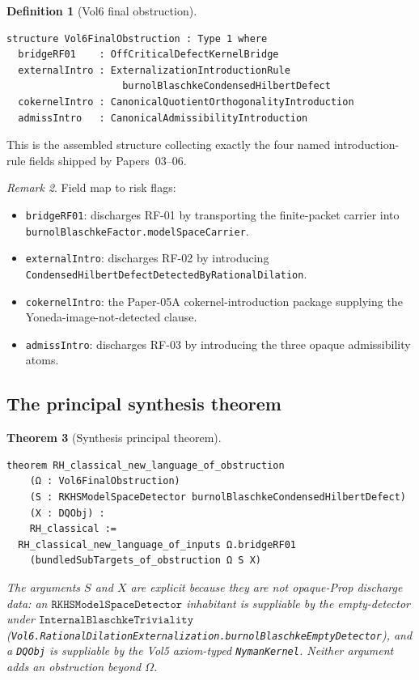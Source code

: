 \documentclass[11pt]{article}
\theoremstyle{plain}
\newtheorem{theorem}{Theorem}[section]
\theoremstyle{definition}
\newtheorem{definition}[theorem]{Definition}
\theoremstyle{remark}
\newtheorem{remark}[theorem]{Remark}
\newcommand{\code}[1]{\texttt{#1}}
\newcommand{\Obs}{\Omega}
\begin{document}
\begin{definition}[Vol6 final obstruction]
\label{def:final-obstruction}
\begin{lstlisting}
structure Vol6FinalObstruction : Type 1 where
  bridgeRF01    : OffCriticalDefectKernelBridge
  externalIntro : ExternalizationIntroductionRule
                    burnolBlaschkeCondensedHilbertDefect
  cokernelIntro : CanonicalQuotientOrthogonalityIntroduction
  admissIntro   : CanonicalAdmissibilityIntroduction
\end{lstlisting}
This is the assembled structure collecting exactly the four named
introduction-rule fields shipped by Papers~03--06.
\end{definition}

\begin{remark}
Field map to risk flags:
\begin{itemize}
  \item \code{bridgeRF01}: discharges RF-01 by transporting the
        finite-packet carrier into
        \code{burnolBlaschkeFactor.modelSpaceCarrier}.
  \item \code{externalIntro}: discharges RF-02 by introducing
        \code{CondensedHilbertDefectDetectedByRationalDilation}.
  \item \code{cokernelIntro}: the Paper-05A cokernel-introduction
        package supplying the Yoneda-image-not-detected
        clause.
  \item \code{admissIntro}: discharges RF-03 by introducing the
        three opaque admissibility atoms.
\end{itemize}
\end{remark}

\subsection{The principal synthesis theorem}

\begin{theorem}[Synthesis principal theorem]
\label{thm:synthesis-principal}
\begin{lstlisting}
theorem RH_classical_new_language_of_obstruction
    (Ω : Vol6FinalObstruction)
    (S : RKHSModelSpaceDetector burnolBlaschkeCondensedHilbertDefect)
    (X : DQObj) :
    RH_classical :=
  RH_classical_new_language_of_inputs Ω.bridgeRF01
    (bundledSubTargets_of_obstruction Ω S X)
\end{lstlisting}
The arguments \(S\) and \(X\) are explicit because they are
\emph{not} opaque-Prop discharge data: an
\(\code{RKHSModelSpaceDetector}\) inhabitant is suppliable by
the empty-detector under \(\code{InternalBlaschkeTriviality}\)
(\code{Vol6.Rational\-Dilation\-Externalization.burnol\-Blaschke\-Empty\-Detector}),
and a \code{DQObj} is suppliable by the Vol5 axiom-typed
\code{NymanKernel}.  Neither argument adds an obstruction beyond
\(\Obs\).
\end{theorem}
\end{document}
